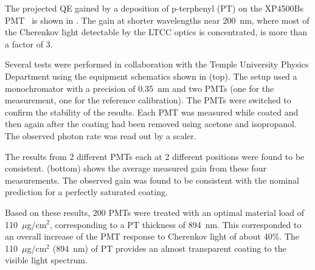 The projected QE gained by a deposition of p-terphenyl (PT) on the XP4500Bs PMT~\cite{Koczon:1457653} is shown
in . The gain at shorter wavelengths near 200~nm, where most of the
Cherenkov light detectable by the LTCC optics is concentrated, is more than a factor of 3.

Several tests were performed in collaboration with the Temple University Physics Department using the equipment
schematics shown in  (top). The setup used a monochromator with a precision
of 0.35~nm and two PMTs (one for the measurement, one for the   reference calibration). The PMTs were switched
to confirm the stability of the results. Each PMT was measured while coated and then again after the coating had
been removed using acetone and isopropanol. The observed photon rate was read out by a scaler.

The results from 2 different PMTs each at 2 different positions were found to be consistent.
 (bottom) shows the average measured gain from these four measurements. The
observed gain was found to be consistent with the nominal prediction for a perfectly saturated coating.

Based on these results, 200 PMTs were treated \cite{Joosten:2016lcl} with an optimal material load of
110~$\mu$g/cm$^2$, corresponding to a PT thickness of 894~nm. This corresponded to an overall increase of the PMT
response to Cherenkov light of about 40\%. The 110~$\mu$g/cm$^2$ (894~nm) of PT provides an almost transparent
coating to the visible light spectrum.
